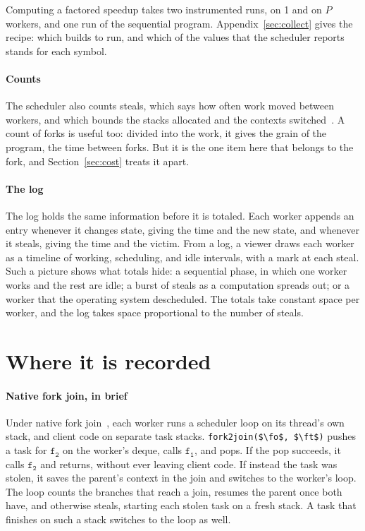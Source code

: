 \documentclass[sigplan,nonacm]{acmart}
\newcommand{\fo}{\mathtt{f_1}}
\newcommand{\ft}{\mathtt{f_2}}
\begin{document}
Computing a factored speedup takes two instrumented runs, on 1 and on
$P$ workers, and one run of the sequential program.
%
Appendix~\ref{sec:collect} gives the recipe: which builds to run, and
which of the values that the scheduler reports stands for each symbol.

\paragraph{Counts}
%
The scheduler also counts steals, which says how often work moved
between workers, and which bounds the stacks allocated and the
contexts switched~\cite{nativeforkjoin}.
%
A count of forks is useful too: divided into the work, it gives the
grain of the program, the time between forks.
%
But it is the one item here that belongs to the fork, and
Section~\ref{sec:cost} treats it apart.

\paragraph{The log}
%
The log holds the same information before it is totaled.
%
Each worker appends an entry whenever it changes state, giving the
time and the new state, and whenever it steals, giving the time and
the victim.
%
From a log, a viewer draws each worker as a timeline of working,
scheduling, and idle intervals, with a mark at each steal.
%
Such a picture shows what totals hide: a sequential phase, in which
one worker works and the rest are idle; a burst of steals as a
computation spreads out; or a worker that the operating system
descheduled.
%
The totals take constant space per worker, and the log takes space
proportional to the number of steals.

\section{Where it is recorded}
\label{sec:where}

\paragraph{Native fork join, in brief}
%
Under native fork join~\cite{nativeforkjoin}, each worker runs a
scheduler loop on its thread's own stack, and client code on separate
task stacks.
%
\lstinline|fork2join($\fo$, $\ft$)| pushes a task for $\ft$ on the
worker's deque, calls $\fo$, and pops.
%
If the pop succeeds, it calls $\ft$ and returns, without ever leaving
client code.
%
If instead the task was stolen, it saves the parent's context in the
join and switches to the worker's loop.
%
The loop counts the branches that reach a join, resumes the parent
once both have, and otherwise steals, starting each stolen task on a
fresh stack.
%
A task that finishes on such a stack switches to the loop as well.
\end{document}
